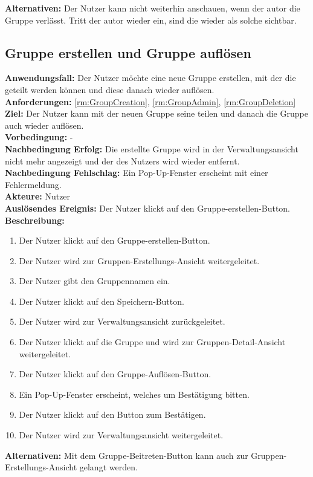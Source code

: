 \documentclass[parskip=full]{scrartcl}
\begin{document}
\textbf{Alternativen:} Der Nutzer kann   nicht weiterhin anschauen, wenn der \gls{autor} die Gruppe verlässt. Tritt der \gls{autor} wieder ein, sind die   wieder als solche sichtbar.
\newpage

\subsection{Gruppe erstellen und Gruppe auflösen}
\textbf{Anwendungsfall:} Der Nutzer möchte eine neue Gruppe erstellen, mit der die  geteilt werden können und diese danach wieder auflösen.\\
\textbf{Anforderungen:} \ref{rm:GroupCreation}, \ref{rm:GroupAdmin}, \ref{rm:GroupDeletion} \\
\textbf{Ziel:} Der Nutzer kann mit der neuen Gruppe seine  teilen und danach die Gruppe auch wieder auflösen.\\
\textbf{Vorbedingung:} -\\
\textbf{Nachbedingung Erfolg:} Die erstellte Gruppe wird in der Verwaltungsansicht nicht mehr angezeigt und der  des Nutzers wird wieder entfernt.\\
\textbf{Nachbedingung Fehlschlag:} Ein Pop-Up-Fenster erscheint mit einer Fehlermeldung.\\
\textbf{Akteure:} Nutzer\\
\textbf{Auslösendes Ereignis:} Der Nutzer klickt auf den Gruppe-erstellen-Button.\\
\textbf{Beschreibung:}
\begin{enumerate}
    \item Der Nutzer klickt auf den Gruppe-erstellen-Button.
    \item Der Nutzer wird zur Gruppen-Erstellungs-Ansicht weitergeleitet.
    \item Der Nutzer gibt den Gruppennamen ein.
    \item Der Nutzer klickt auf den Speichern-Button.
    \item Der Nutzer wird zur Verwaltungsansicht zurückgeleitet.
    \item Der Nutzer klickt auf die Gruppe und wird zur Gruppen-Detail-Ansicht weitergeleitet.
    \item Der Nutzer klickt auf den Gruppe-Auflösen-Button.
    \item Ein Pop-Up-Fenster erscheint, welches um Bestätigung bitten.
    \item Der Nutzer klickt auf den Button zum Bestätigen.
    \item Der Nutzer wird zur Verwaltungsansicht weitergeleitet.
\end{enumerate}
\textbf{Alternativen:} Mit dem Gruppe-Beitreten-Button kann auch zur Gruppen-Erstellungs-Ansicht gelangt werden.
\newpage
\end{document}
